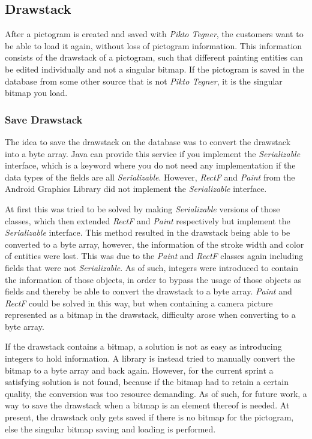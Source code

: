 \subsection{Drawstack}
After a pictogram is created and saved with \textit{Pikto Tegner}, the customers want to be able to load it again, without loss of pictogram information.
This information consists of the drawstack of a pictogram, such that different painting entities can be edited individually and not a singular bitmap.
If the pictogram is saved in the database from some other source that is not \textit{Pikto Tegner}, it is the singular bitmap you load.

\subsubsection*{Save Drawstack}
The idea to save the drawstack on the database was to convert the drawstack into a byte array.
Java can provide this service if you implement the \textit{Serializable} interface, which is a keyword where you do not need any implementation if the data types of the fields are all \textit{Serializable}.
However, \textit{RectF} and \textit{Paint} from the Android Graphics Library did not implement the \textit{Serializable} interface.

At first this was tried to be solved by making \textit{Serializable} versions of those classes, which then extended \textit{RectF} and \textit{Paint} respectively but implement the \textit{Serializable} interface.
This method resulted in the drawstack being able to be converted to a byte array, however, the information of the stroke width and color of entities were lost.
This was due to the \textit{Paint} and \textit{RectF} classes again including fields that were not \textit{Serializable}.
As of such, integers were introduced to contain the information of those objects, in order to bypass the usage of those objects as fields and thereby be able to convert the drawstack to a byte array.
\textit{Paint} and \textit{RectF} could be solved in this way, but when containing a camera picture represented as a bitmap in the drawstack, difficulty arose when converting to a byte array.

If the drawstack contains a bitmap, a solution is not as easy as introducing integers to hold information.
A library is instead tried to manually convert the bitmap to a byte array and back again.
However, for the current sprint a satisfying solution is not found, because if the bitmap had to retain a certain quality, the conversion was too resource demanding.
As of such, for future work, a way to save the drawstack when a bitmap is an element thereof is needed.
At present, the drawstack only gets saved if there is no bitmap for the pictogram, else the singular bitmap saving and loading is performed.

